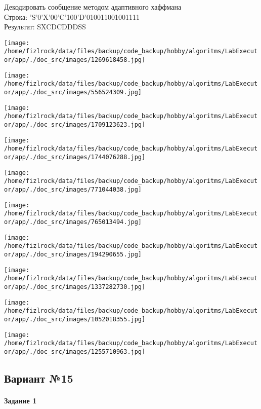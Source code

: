 \documentclass[a4paper, 12pt]{article}
\begin{document}
Декодировать сообщение методом адаптивного хаффмана \\
Строка: 
'S'0'X'00'C'100'D'010011001001111\\
Результат: SXCDCDDDSS

\texttt{[image: /home/fizlrock/data/files/backup/code\_backup/hobby/algoritms/LabExecutor/app/./doc\_src/images/1269618458.jpg]}

\texttt{[image: /home/fizlrock/data/files/backup/code\_backup/hobby/algoritms/LabExecutor/app/./doc\_src/images/556524309.jpg]}

\texttt{[image: /home/fizlrock/data/files/backup/code\_backup/hobby/algoritms/LabExecutor/app/./doc\_src/images/1709123623.jpg]}

\texttt{[image: /home/fizlrock/data/files/backup/code\_backup/hobby/algoritms/LabExecutor/app/./doc\_src/images/1744076288.jpg]}

\texttt{[image: /home/fizlrock/data/files/backup/code\_backup/hobby/algoritms/LabExecutor/app/./doc\_src/images/771044038.jpg]}

\texttt{[image: /home/fizlrock/data/files/backup/code\_backup/hobby/algoritms/LabExecutor/app/./doc\_src/images/765013494.jpg]}

\texttt{[image: /home/fizlrock/data/files/backup/code\_backup/hobby/algoritms/LabExecutor/app/./doc\_src/images/194290655.jpg]}

\texttt{[image: /home/fizlrock/data/files/backup/code\_backup/hobby/algoritms/LabExecutor/app/./doc\_src/images/1337282730.jpg]}

\texttt{[image: /home/fizlrock/data/files/backup/code\_backup/hobby/algoritms/LabExecutor/app/./doc\_src/images/1052018355.jpg]}

\texttt{[image: /home/fizlrock/data/files/backup/code\_backup/hobby/algoritms/LabExecutor/app/./doc\_src/images/1255710963.jpg]}
\pagebreak
\subsection{Вариант №15}
\paragraph{Задание 1}
\end{document}
